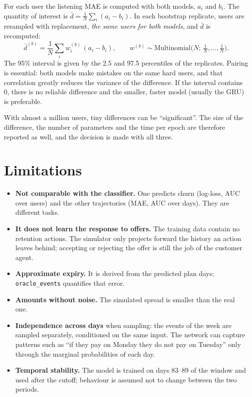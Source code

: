 \documentclass[11pt]{article}
\newcommand{\code}[1]{\texttt{#1}}
\begin{document}
For each user the listening MAE is computed with both models, $a_i$ and $b_i$. The quantity of interest is $\bar d = \frac1N \sum_i (a_i - b_i)$. In each bootstrap replicate, users are resampled with replacement, \emph{the same users for both models}, and $\bar d$ is recomputed:
\begin{equation}
\bar d^{(b)} = \frac{1}{N}\sum_{i} w_i^{(b)}\,(a_i - b_i), \qquad w^{(b)} \sim \text{Multinomial}\big(N;\, \tfrac1N, \dots, \tfrac1N\big).
\end{equation}
The 95\% interval is given by the 2.5 and 97.5 percentiles of the replicates. Pairing is essential: both models make mistakes on the same hard users, and that correlation greatly reduces the variance of the difference. If the interval contains 0, there is no reliable difference and the smaller, faster model (usually the GRU) is preferable.

With almost a million users, tiny differences can be ``significant''. The size of the difference, the number of parameters and the time per epoch are therefore reported as well, and the decision is made with all three.

\section{Limitations}

\begin{itemize}
  \item \textbf{Not comparable with the classifier.} One predicts churn (log-loss, AUC over users) and the other trajectories (MAE, AUC over days). They are different tasks.
  \item \textbf{It does not learn the response to offers.} The training data contain no retention actions. The simulator only projects forward the history an action leaves behind; accepting or rejecting the offer is still the job of the customer agent.
  \item \textbf{Approximate expiry.} It is derived from the predicted plan days; \code{oracle\_events} quantifies that error.
  \item \textbf{Amounts without noise.} The simulated spread is smaller than the real one.
  \item \textbf{Independence across days} when sampling: the events of the week are sampled separately, conditioned on the same input. The network can capture patterns such as ``if they pay on Monday they do not pay on Tuesday'' only through the marginal probabilities of each day.
  \item \textbf{Temporal stability.} The model is trained on days 83--89 of the window and used after the cutoff; behaviour is assumed not to change between the two periods.
\end{itemize}
\end{document}
